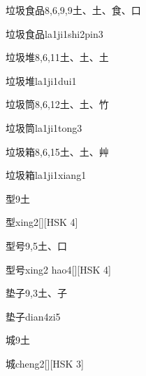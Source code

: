 \begin{entry}{垃圾食品}{8,6,9,9}{⼟、⼟、⾷、⼝}
  \begin{phonetics}{垃圾食品}{la1ji1shi2pin3}
  \end{phonetics}
\end{entry}

\begin{entry}{垃圾堆}{8,6,11}{⼟、⼟、⼟}
  \begin{phonetics}{垃圾堆}{la1ji1dui1}
  \end{phonetics}
\end{entry}

\begin{entry}{垃圾筒}{8,6,12}{⼟、⼟、⽵}
  \begin{phonetics}{垃圾筒}{la1ji1tong3}
  \end{phonetics}
\end{entry}

\begin{entry}{垃圾箱}{8,6,15}{⼟、⼟、⾋}
  \begin{phonetics}{垃圾箱}{la1ji1xiang1}
  \end{phonetics}
\end{entry}

\begin{entry}{型}{9}{⼟}
  \begin{phonetics}{型}{xing2}[][HSK 4]
  \end{phonetics}
\end{entry}

\begin{entry}{型号}{9,5}{⼟、⼝}
  \begin{phonetics}{型号}{xing2 hao4}[][HSK 4]
  \end{phonetics}
\end{entry}

\begin{entry}{垫子}{9,3}{⼟、⼦}
  \begin{phonetics}{垫子}{dian4zi5}
  \end{phonetics}
\end{entry}

\begin{entry}{城}{9}{⼟}
  \begin{phonetics}{城}{cheng2}[][HSK 3]
  \end{phonetics}
\end{entry}

